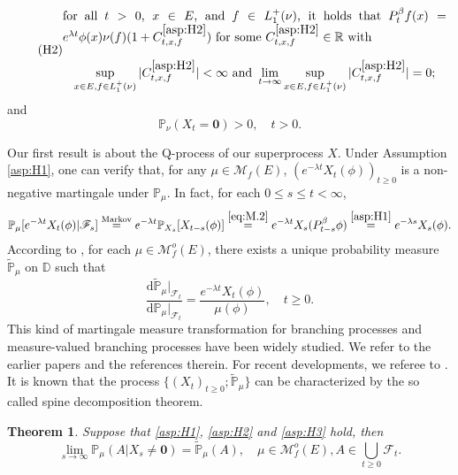 \documentclass[12pt,a4paper]{amsart}
\numberwithin{equation}{section}
\theoremstyle{plain}
\newtheorem{thm}{Theorem}[section]
\theoremstyle{definition}
\theoremstyle{remark}
\begin{document}
\begin{equation} \label{asp:H2} \tag{H2}
\begin{minipage}{0.9\textwidth}
	for all $t>0$, $x\in E$, and $f\in L_1^+(\nu)$, it holds that $P_t^\beta f(x) = e^{\lambda t} \phi(x) \nu(f) (1+ C^{\eqref{asp:H2}}_{t,x,f})$ for some $C^{\eqref{asp:H2}}_{t,x,f}\in \mathbb R$ with
\[
	\sup_{x\in E, f\in L_1^+(\nu)} |C^{\eqref{asp:H2}}_{t,x,f}| 
	< \infty
	\text{ and }
	\lim_{t\to \infty} \sup_{x\in E, f\in L_1^+(\nu)} |C^{\eqref{asp:H2}}_{t,x,f}| 
	= 0;
\]
\end{minipage}
\end{equation}
	and 
\begin{equation} \label{asp:H3} \tag{H3}
	\mathbb P_\nu(X_t = \mathbf 0)>0, \quad t> 0.
\end{equation}

	Our first result is about the Q-process of our superprocess $X$.
	Under Assumption \eqref{asp:H1}, one can verify that, for any $\mu \in \mathcal M_f(E)$, $(e^{-\lambda t}  X_t(\phi))_{t\geq 0}$ is a non-negative martingale under $\mathbb P_\mu$.
	In fact, for each $0\leq s\leq t< \infty$,
\begin{equation} \label{eq:M.25}
	\mathbb P_\mu[e^{-\lambda t}X_t(\phi)|\mathscr F_s]
	\overset{\text{Markov}} = e^{-\lambda t} \mathbb P_{X_s}[X_{t-s}(\phi)]
	\overset{\eqref{eq:M.2}}= e^{-\lambda t}X_s(P_{t-s}^\beta \phi)
	\overset{\eqref{asp:H1}}=e^{-\lambda s}X_s(\phi).
\end{equation}
	According to \cite[Lemma 18.18]{Kallenberg2002Foundations}, for each $\mu \in \mathcal M_f^o(E)$, there exists a unique probability measure $\widetilde {\mathbb P}_\mu$  on $\mathbb D$ such that
\begin{equation} \label{eq:M.3}
	\frac{{\mathrm d}\widetilde{\mathbb P}_\mu|_{\mathscr F_t}}{{\mathrm d}\mathbb P_\mu|_{\mathscr F_t}}
	=\frac{e^{-\lambda t}X_t(\phi)}{\mu(\phi) },
	\quad t\geq 0.
\end{equation}
	This kind of martingale measure transformation for branching processes and measure-valued branching processes have been widely studied.
	We refer to the earlier papers \cite{EnglanderKyprianou2004Local,Evans1993Two,RoellyRouault1989Processus,Penisson2010Conditional} and the references therein. 
	For recent developments, we referee to \cite{ChampagnatRoelly2008Limit,RenSongSun2020Spine,RenSongZhang2018Williams}.
	It is known that the process $\{(X_t)_{t\geq 0}; \widetilde{\mathbb P}_{\mu}\}$ can be characterized by the so called spine decomposition theorem.
\begin{thm} \label{thm:Q}
	Suppose that \eqref{asp:H1}, \eqref{asp:H2} and \eqref{asp:H3} hold, then
\[
	\lim_{s\rightarrow\infty}\mathbb P_\mu(A |X_s\neq \mathbf 0)=\widetilde{\mathbb P}_\mu(A), 
	\quad \mu \in \mathcal M_f^o(E), A\in \bigcup_{t\geq 0}\mathscr F_t.
\]
\end{thm}
\end{document}
